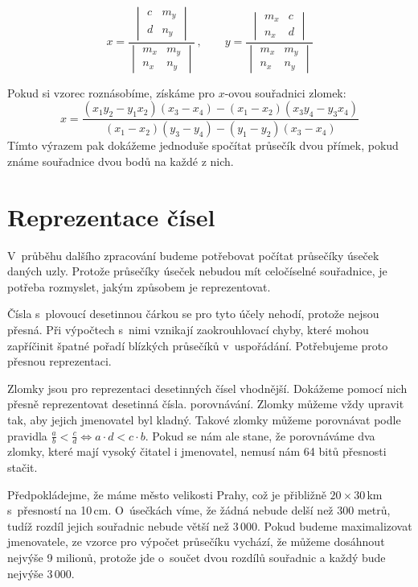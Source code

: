 $$x = \frac{
	\begin{vmatrix}
		c & m_y \\
		d & n_y
	\end{vmatrix}
}
{
	\begin{vmatrix} 
		m_x & m_y \\
		n_x & n_y 
	\end{vmatrix}
}\,\!,\qquad
y = \frac{
	\begin{vmatrix}
		m_x & c \\
		n_x & d
	\end{vmatrix}
}
{
	\begin{vmatrix} 
		m_x & m_y \\
		n_x & n_y 
	\end{vmatrix}
}
$$

Pokud si vzorec roznásobíme, získáme pro $x$-ovou souřadnici zlomek:
$$
x=\frac{(x_1 y_2-y_1 x_2)(x_3-x_4)-(x_1-x_2)(x_3 y_4-y_3 x_4)}
{(x_1-x_2)(y_3-y_4)-(y_1-y_2)(x_3-x_4)}$$
Tímto výrazem pak dokážeme jednoduše spočítat průsečík dvou přímek, pokud známe
souřadnice dvou bodů na každé z nich.

\section{Reprezentace čísel}
V~průběhu dalšího zpracování budeme potřebovat počítat průsečíky úseček daných
uzly. Protože průsečíky úseček nebudou mít celočíselné souřadnice, je potřeba
rozmyslet, jakým způsobem je reprezentovat.

{\tuc Čísla s~plovoucí desetinnou čárkou} se pro tyto účely nehodí, protože
nejsou přesná. Při výpočtech s~nimi vznikají zaokrouhlovací chyby, které mohou
zapříčinit špatné pořadí blízkých průsečíků v~uspořádání. Potřebujeme proto
přesnou reprezentaci.

{\tuc Zlomky} jsou pro reprezentaci desetinných čísel vhodnější. Dokážeme pomocí
nich přesně reprezentovat desetinná čísla.  porovnávání. Zlomky můžeme vždy
upravit tak, aby jejich jmenovatel byl kladný.  Takové zlomky můžeme porovnávat
podle pravidla $\frac{a}{b} < \frac{c}{d} \Leftrightarrow a\cdot d < c\cdot b $. 
Pokud se nám ale stane, že porovnáváme dva zlomky, které mají vysoký čitatel i
jmenovatel, nemusí nám 64 bitů přesnosti stačit.

Předpokládejme, že máme město velikosti Prahy, což je přibližně $20 \times
30$\,km s~přesností na 10\,cm. O~úsečkách víme, že žádná nebude delší než 300
metrů, tudíž rozdíl jejich souřadnic nebude větší než 3\,000. Pokud budeme
maximalizovat jmenovatele, ze vzorce pro výpočet průsečíku vychází, že můžeme
dosáhnout nejvýše 9 milionů, protože jde o~součet dvou rozdílů souřadnic a každý
bude nejvýše 3\,000.

